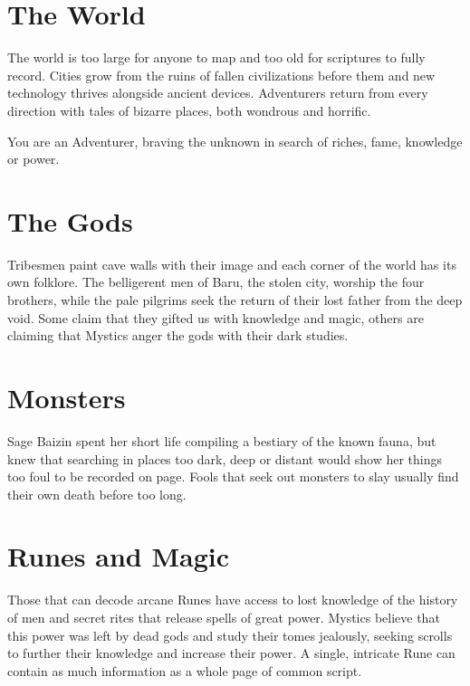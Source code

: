 \documentclass[itdr]{subfiles}
\begin{document}
\begin{minipage}{\textwidth}
\toc[2] %
\end{minipage}

\vfill


\clearpage


\section*{The World}

The world is too large for anyone to map and too old for scriptures to fully record. Cities grow from the ruins of fallen civilizations before them and new technology thrives alongside ancient devices. Adventurers return from every direction with tales of bizarre places, both wondrous and horrific.

You are an Adventurer, braving the unknown in search of riches, fame, knowledge or power.

\section*{The Gods}

Tribesmen paint cave walls with their image and each corner of the world has its own folklore. The belligerent men of Baru, the stolen city, worship the four brothers, while the pale pilgrims seek the return of their lost father from the deep void. Some claim that they gifted us with knowledge and magic, others are claiming that Mystics anger the gods with their dark studies.

\section*{Monsters}

Sage Baizin spent her short life compiling a bestiary of the known fauna, but knew that searching in places too dark, deep or distant would show her things too foul to be recorded on page. Fools that seek out monsters to slay usually find their own death before too long.

\section*{Runes and Magic}
Those that can decode arcane Runes have access to lost knowledge of the history of men and secret rites that release spells of great power. Mystics believe that this power was left by dead gods and study their tomes jealously, seeking scrolls to further their knowledge and increase their power. A single, intricate Rune can contain as much information as a whole page of common script.
\end{document}
